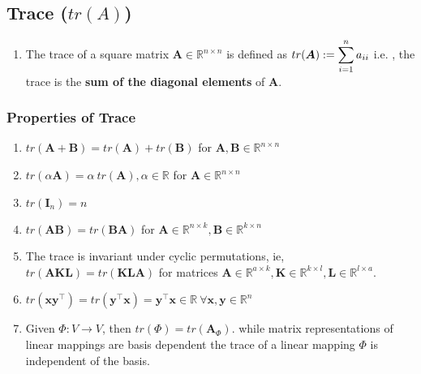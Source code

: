\subsection{Trace ($tr(A)$)}


\begin{enumerate}
    \item The trace of a square matrix $\bm{A} \in \mathbb{R}^{n\times n}$ is defined as $tr(\bm{A}) := \displaystyle\sum^n _{i=1} a_{ii}$ i.e. , the trace is the \textbf{sum of the diagonal elements} of $\bm{A}$.
    \hfill \cite{mfml/book/mml/Deisenroth-Faisal-Ong}

    
\end{enumerate}


\subsubsection{Properties of Trace}

\begin{enumerate}
    \item $tr(\bm{A} + \bm{B}) = tr(\bm{A}) + tr(\bm{B})$ for $\bm{A}, \bm{B} \in \mathbb{R}^{n\times n}$
    \hfill \cite{mfml/book/mml/Deisenroth-Faisal-Ong}

    \item $tr(\alpha \bm{A}) = \alpha\ tr(\bm{A}), \alpha \in \mathbb{R}$ for $\bm{A} \in \mathbb{R}^{n\times n}$
    \hfill \cite{mfml/book/mml/Deisenroth-Faisal-Ong}
    
    \item $tr(\bm{I}_n) = n$
    \hfill \cite{mfml/book/mml/Deisenroth-Faisal-Ong}
    
    \item $tr(\bm{AB}) = tr(\bm{BA})$ for $\bm{A} \in \mathbb{R}^{n\times k}, \bm{B} \in \mathbb{R}^{k\times n}$
    \hfill \cite{mfml/book/mml/Deisenroth-Faisal-Ong}

    \item The trace is invariant under cyclic permutations, ie, $tr(\bm{AKL}) = tr(\bm{KLA})$ for matrices $\bm{A} \in  \mathbb{R}^{a \times k}, \bm{K} \in  \mathbb{R}^{k \times l}, \bm{L} \in  \mathbb{R}^{l \times a}$. 
    \hfill \cite{mfml/book/mml/Deisenroth-Faisal-Ong}

    \item $
        tr(\bm{xy}^\top) = tr(\bm{y} ^\top \bm{x}) = \bm{y} ^\top \bm{x} \in \mathbb{R}\ 
        \forall \bm{x}, \bm{y} \in \mathbb{R}^n
    $
    \hfill \cite{mfml/book/mml/Deisenroth-Faisal-Ong}

    \item Given $\Phi : V \to V$, then $tr(\Phi) = tr(\bm{A}_\Phi)$. while matrix representations of linear mappings are basis dependent the trace of a linear mapping $\Phi$ is independent of the basis.
    \hfill \cite{mfml/book/mml/Deisenroth-Faisal-Ong}
\end{enumerate}







